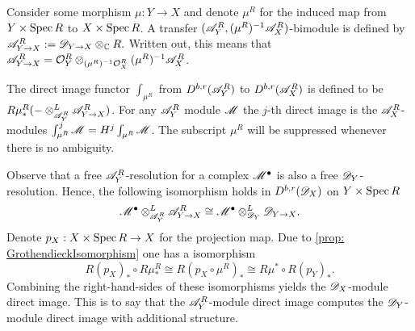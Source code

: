     Consider some morphism $\mu:Y\to X$ and denote $\mu^R$ for the induced map from $Y\times \operatorname{Spec} R$ to $X\times \operatorname{Spec} R$.
    A transfer $(\mathscr{A}_Y^R,(\mu^R)^{-1}\mathscr{A}_X^R)$-bimodule is defined by $\mathscr{A}_{Y\to X}^R:= \mathscr{D}_{Y\to X}\otimes_{\mathbb{C}} R .$ Written out, this means that $\mathscr{A}_{Y\to X}^R = \mathcal{O}_Y^R \otimes_{(\mu^R)^{-1}\mathcal{O}_X^R}(\mu^R)^{-1}\mathscr{A}_X^R$.
    \begin{definition}
      The direct image functor $\int_{\mu^R}$ from $D^{b,r}(\mathscr{A}_Y^R)$ to $D^{b,r}(\mathscr{A}_X^R)$ is defined to be $R\mu^R_* ({-}\otimes_{\mathscr{A}_Y^R}^L \mathscr{A}_{Y\to X}^R)$.
      For any $\mathscr{A}_Y^R$ module $\mathscr{M}$ the $j$-th direct image is the $\mathscr{A}_X^R$-modules $\int^j_{\mu^R} \mathscr{M} = H^j \int_{\mu^R} \mathscr{M}$.
      The subscript $\mu^R$ will be suppressed whenever there is no ambiguity.
    \end{definition}
    Observe that a free $\mathscr{A}_Y^R$-resolution for a complex $\mathscr{M}^\bullet$ is also a free $\mathscr{D}_Y$-resolution.
    Hence, the following isomorphism holds in $D^{b,r}(\mathscr{D}_X)$ on $Y\times \operatorname{Spec} R$
    $$\mathscr{M}^\bullet \otimes_{\mathscr{A}_Y^R}^L \mathscr{A}_{Y\to X}^R \cong \mathscr{M}^\bullet \otimes_{\mathscr{D}_Y}^L \mathscr{D}_{Y\to X}.$$
    Denote $p_X:X\times \operatorname{Spec} R \to X$ for the projection map.
    Due to \cref{prop: GrothendieckIsomorphism} one has a isomorphism
    $$R(p_X)_* \circ R\mu^R_* \cong R(p_X \circ \mu^R)_* \cong R\mu^* \circ R(p_Y)_*.$$
    Combining the right-hand-sides of these isomorphisms yields the $\mathscr{D}_X$-module direct image.
    This is to say that the $\mathscr{A}_Y^R$-module direct image computes the $\mathscr{D}_Y$-module direct image with additional structure.

